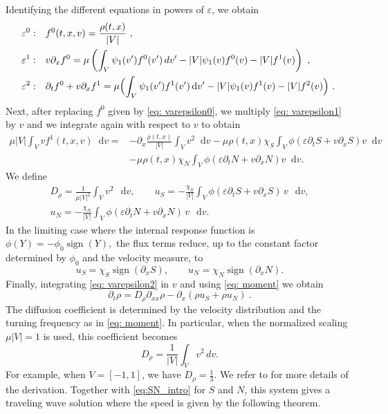 \documentclass[11pt,twoside]{article}
\numberwithin{equation}{section}
\DeclareMathOperator{\sign}{sign}
\newcommand*\diff{\mathop{}\!\mathrm{d}}
\theoremstyle{plain}
\theoremstyle{nonumberplain}
\begin{document}
{\noindent Identifying the different equations in powers of $\varepsilon$, we obtain
\fi
\begin{align}
    \varepsilon^0: & \quad f^0(t,{x},{v})=\frac{\rho(t,{x})}{|V|}\ ,\label{eq: varepsilon0}\\
    \varepsilon^1: & \quad 
    v \partial_x f^0
=
\mu \left(
\int_V \psi_1(v') f^0(v')\,dv'
- |V| \psi_1(v) f^0(v)
- |V| f^1(v)
\right)\ ,\label{eq: varepsilon1}\\
    \varepsilon^2: & \quad \partial_tf^0+{v}\partial_x f^1 =\mu\Bigl(\int_V\psi_1(v')f^1(v')\diff v'-|V|\psi_1(v)f^1(v)-|V|f^2(v)\Bigr) \ \label{eq: varepsilon2}.\
\end{align}
Next, after replacing $f^0$ given by  \eqref{eq: varepsilon0}, we multiply \eqref{eq: varepsilon1} by ${v}$ and we integrate again with respect to ${v}$ to obtain
\begin{align}
    \mu|V|\int_V vf^1(t,x,v) \diff v=&-\partial_x\frac{\rho(t,x)}{|V|}\int_V v^2\diff v-\mu\rho(t,x)\chi_S\int_V\phi(\varepsilon\partial_tS+v\partial_xS)v\diff v\nonumber\\ &-\mu\rho(t,x)\chi_N\int_V\phi(\varepsilon\partial_tN+v\partial_xN)v\diff v.\label{eq: mean direction}
\end{align}
We define
\begin{equation}
\label{eq: moment}
\begin{gathered}
D_\rho
=
\frac{1}{\mu |V|^2}\int_V v^2\,\diff v,
\qquad
u_S
=
-\frac{\chi_S}{|V|}
\int_V \phi(\varepsilon\partial_t S+v\partial_x S)\,v\,\diff v,
\\[4pt]
u_N
=
-\frac{\chi_N}{|V|}
\int_V \phi(\varepsilon\partial_t N+v\partial_x N)\,v\,\diff v .
\end{gathered}
\end{equation}
In the limiting case where the internal response function is $\phi(Y)=-\phi_0\sign(Y),$
the flux terms reduce, up to the constant factor determined by
$\phi_0$ and the velocity measure, to \cite{calvez2019chemotactic}
\[
u_S=\chi_S\sign(\partial_x S),
\qquad
u_N=\chi_N\sign(\partial_x N).
\]
Finally, integrating \eqref{eq: varepsilon2} in ${v}$ and using \eqref{eq: moment} we obtain
\[
\partial_t\rho=D_\rho\partial_{xx}\rho-\partial_x(\rho u_S+\rho u_N)\ .
\]
{
The diffusion coefficient is determined by the velocity distribution and
the turning frequency as in \eqref{eq: moment}. 
In particular, when the normalized scaling \(\mu |V|=1\) is used, this
coefficient becomes
\begin{equation}
\label{def:Drho}
  D_\rho
=
\frac1{|V|}
\int_V v^2\,dv .  
\end{equation}
For example, when \( V = [-1,1] \), we have $D_\rho = \frac{1}{3}$.
}
We refer to \cite{emako2015existence,emako2016traveling} for more details of the derivation.
Together with \eqref{eq:SN_intro} for $S$ and $N$, this system gives a traveling wave solution where the speed is given by the following theorem.

}
\end{document}
